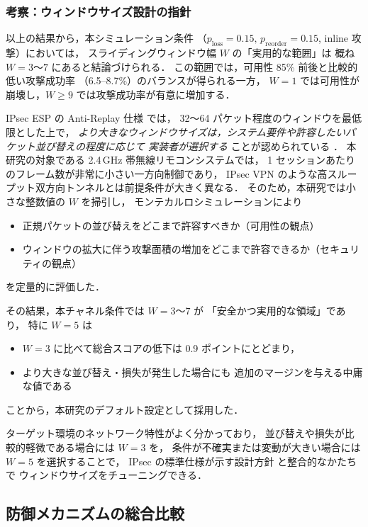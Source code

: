 \documentclass[twocolumn,10pt,a4paper]{jsarticle}
\begin{document}
\subsubsection{考察：ウィンドウサイズ設計の指針}

以上の結果から，本シミュレーション条件
（$p_{\mathrm{loss}}=0.15,\,p_{\mathrm{reorder}}=0.15$, inline 攻撃）においては，
スライディングウィンドウ幅 $W$ の「実用的な範囲」は
概ね $W=3$～$7$ にあると結論づけられる．
この範囲では，可用性 85\% 前後と比較的低い攻撃成功率
（6.5--8.7\%）のバランスが得られる一方，
$W=1$ では可用性が崩壊し，$W \ge 9$ では攻撃成功率が有意に増加する．

IPsec ESP の Anti-Replay 仕様 \cite{rfc4303,rfc6479} では，
32～64 パケット程度のウィンドウを最低限とした上で，
\emph{より大きなウィンドウサイズは，システム要件や許容したいパケット並び替えの程度に応じて
実装者が選択する} ことが認められている \cite{rfc4303,rfc6479}．
本研究の対象である 2.4\,GHz 帯無線リモコンシステムでは，
1 セッションあたりのフレーム数が非常に小さい一方向制御であり，
IPsec VPN のような高スループット双方向トンネルとは前提条件が大きく異なる．
そのため，本研究では小さな整数値の $W$ を掃引し，
モンテカルロシミュレーションにより
\begin{itemize}
  \item 正規パケットの並び替えをどこまで許容すべきか（可用性の観点）
  \item ウィンドウの拡大に伴う攻撃面積の増加をどこまで許容できるか（セキュリティの観点）
\end{itemize}
を定量的に評価した．

その結果，本チャネル条件では $W=3$～$7$ が
「安全かつ実用的な領域」であり，
特に $W=5$ は
\begin{itemize}
  \item $W=3$ に比べて総合スコアの低下は 0.9 ポイントにとどまり，
  \item より大きな並び替え・損失が発生した場合にも
        追加のマージンを与える中庸な値である
\end{itemize}
ことから，本研究のデフォルト設定として採用した．

ターゲット環境のネットワーク特性がよく分かっており，
並び替えや損失が比較的軽微である場合には $W=3$ を，
条件が不確実または変動が大きい場合には $W=5$ を選択することで，
IPsec の標準仕様が示す設計方針 \cite{rfc4303,rfc6479} と整合的なかたちで
ウィンドウサイズをチューニングできる．

\subsection{防御メカニズムの総合比較}
\end{document}

